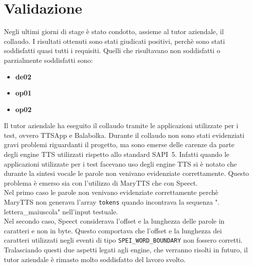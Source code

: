 \section{Validazione}
Negli ultimi giorni di stage è stato condotto, assieme al tutor aziendale, il collaudo.
I risultati ottenuti sono stati giudicati positivi, perchè sono stati soddisfatti quasi tutti i requisiti.
Quelli che risultavano non soddisfatti o parzialmente soddisfatti sono:
\begin{itemize}
	\item \textbf{de02}
	\item \textbf{op01}
	\item \textbf{op02}
\end{itemize}
Il tutor aziendale ha eseguito il collaudo tramite le applicazioni utilizzate per i test, ovvero TTSApp e Balabolka.
Durante il collaudo non sono stati evidenziati gravi problemi riguardanti il progetto, ma sono emerse delle carenze da parte degli engine TTS utilizzati rispetto allo standard SAPI~5.
Infatti quando le applicazioni utilizzate per i test facevano uso degli engine TTS si è notato che durante la sintesi vocale le parole non venivano evidenziate correttamente.
Questo problema è emerso sia con l'utilizzo di MaryTTS che con Speect.\\
Nel primo caso le parole non venivano evidenziate correttamente perchè MaryTTS non generava l'array \texttt{tokens} quando incontrava la sequenza ". lettera\_maiuscola" nell'input testuale.\\
Nel secondo caso, Speect considerava l'offset e la lunghezza delle parole in caratteri e non in byte. Questo comportava che l'offset e la lunghezza dei caratteri utilizzati negli eventi di tipo \texttt{SPEI\_WORD\_BOUNDARY} non fossero corretti.\\
Tralasciando questi due aspetti legati agli engine, che verranno risolti in futuro, il tutor aziendale è rimasto molto soddisfatto del lavoro svolto.

